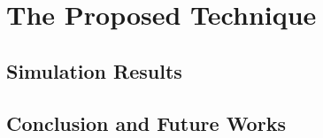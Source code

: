 \documentclass{beamer}
\begin{document}
\section{The Proposed Technique}
\subsection{Simulation Results}
\subsection{Conclusion and Future Works}
\end{document}
